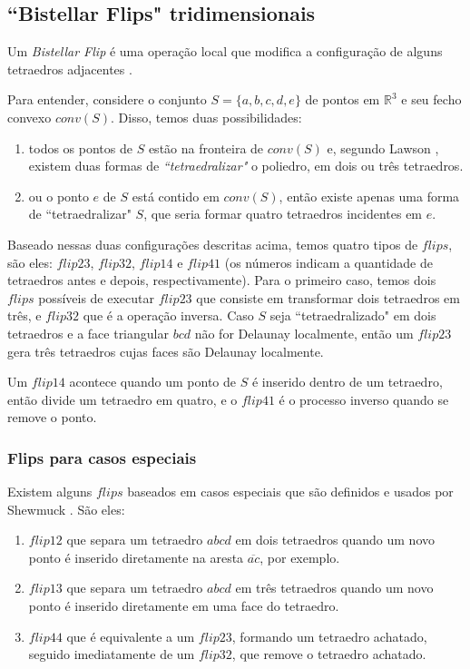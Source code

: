 \subsection{``Bistellar Flips" tridimensionais}

Um \textit{Bistellar Flip} é uma operação local que modifica a configuração de alguns 
tetraedros adjacentes \cite{Lawson1987, Edelsbrunner1992}.

Para entender, considere o conjunto $S = \{a,b,c,d,e\}$ de pontos em $\mathbb{R}^3$ e seu
fecho convexo $conv(S)$. Disso, temos duas possibilidades:
\begin{enumerate}
    \item todos os pontos de $S$ estão na fronteira de $conv(S)$ e, segundo Lawson \cite{Lawson1987},
    existem duas formas de \textit{``tetraedralizar"} o poliedro, em dois ou três tetraedros. 
    \item ou o ponto $e$ de $S$ está contido em $conv(S)$, então existe apenas uma forma de 
    ``tetraedralizar" $S$, que seria formar quatro tetraedros incidentes em $e$.
\end{enumerate}

Baseado nessas duas configurações descritas acima, temos quatro tipos de $flips$, são eles:
$flip23$, $flip32$, $flip14$ e $flip41$ (os números indicam a quantidade de tetraedros 
antes e depois, respectivamente). Para o primeiro caso, temos dois $flips$ possíveis de executar
$flip23$ que consiste em transformar dois tetraedros em três, e $flip32$ que é a operação inversa.
Caso $S$ seja ``tetraedralizado" em dois tetraedros e a face triangular $bcd$ não for Delaunay
localmente, então um $flip23$ gera três tetraedros cujas faces são Delaunay localmente.

Um $flip14$ acontece quando um ponto de $S$ é inserido dentro de um tetraedro, então
divide um tetraedro em quatro, e o $flip41$ é o processo inverso quando se remove o
ponto.

\subsubsection{Flips para casos especiais}

Existem alguns $flips$ baseados em casos especiais que são definidos e usados
por Shewmuck \cite{Shewchuk2003}. São eles:
\begin{enumerate}
    \item $flip12$ que separa um tetraedro $abcd$ em dois tetraedros quando um novo
    ponto é inserido diretamente na aresta $\overline{ac}$, por exemplo.
    \item $flip13$ que separa um tetraedro $abcd$ em três tetraedros quando um novo
    ponto é inserido diretamente em uma face do tetraedro.
    \item $flip44$ que é equivalente a um $flip23$, formando um tetraedro achatado,
    seguido imediatamente de um $flip32$, que remove o tetraedro achatado. 
\end{enumerate}


